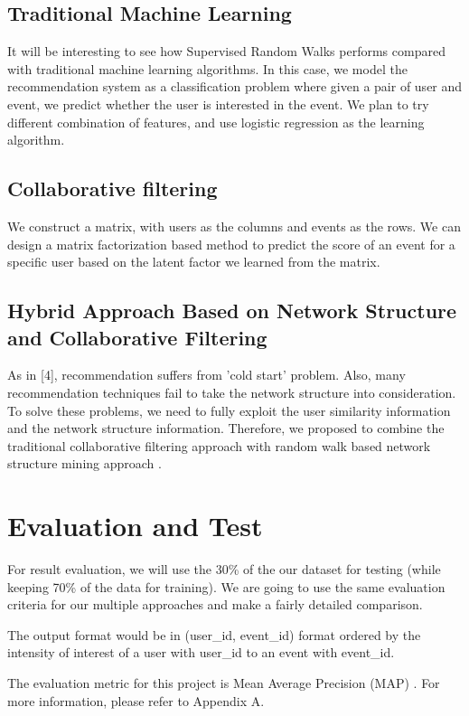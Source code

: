 \documentclass{article}
\begin{document}
\subsection{Traditional Machine Learning}
It will be interesting to see how Supervised Random Walks performs compared with traditional machine learning algorithms. In this case, we model the recommendation system as a classification problem where given a pair of user and event, we predict whether the user is interested in the event. We plan to try different combination of features, and use logistic regression as the learning algorithm. 

\subsection{Collaborative filtering}
We construct a matrix, with users as the columns and events as the rows. We can design a matrix factorization based method to predict the score of an event for a specific user based on the latent factor we learned from the matrix.

\subsection{Hybrid Approach Based on Network Structure and Collaborative Filtering}
As in [4], recommendation suffers from 'cold start' problem. Also, many recommendation techniques fail to take the network structure into consideration. To solve these problems, we need to fully exploit the user similarity information and the network structure information. Therefore, we proposed to combine the traditional collaborative filtering approach with random walk based network structure mining approach . 

\section{Evaluation and Test}
For result evaluation, we will use the 30\% of the our dataset for testing (while keeping 70\% of the data for training). We are going to use the same evaluation criteria for our multiple approaches and make a fairly detailed comparison.

The output format would be in (user\_id, event\_id) format ordered by the intensity of interest of a user with user\_id to an event with event\_id.

The evaluation metric for this project is Mean Average Precision (MAP)	. For more information, please refer to Appendix A.
\end{document}
